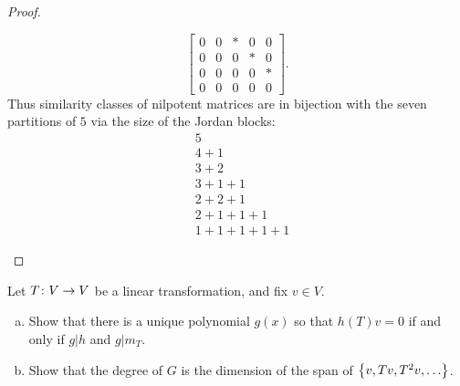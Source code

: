 \documentclass{article}
\begin{document}
\begin{proof}
\begin{enumerate}[(a)]
\[\begin{bmatrix}
        0 & 0 & * & 0 & 0 \\
        0 & 0 & 0 & * & 0 \\
        0 & 0 & 0 & 0 & * \\
        0 & 0 & 0 & 0 & 0
      \end{bmatrix}.
    \] Thus similarity classes of nilpotent matrices are in bijection with the
    seven partitions of $5$ via the size of the Jordan blocks: \begin{align*}
        &5 \\
        &4 + 1 \\
        &3 + 2 \\
        &3 + 1 + 1 \\
        &2 + 2 + 1 \\
        &2 + 1 + 1 + 1\\
        &1 + 1 + 1 + 1 + 1
    \end{align*}
  \end{enumerate}
\end{proof}

\begin{problem}{4} %
  Let $T \colon V \rightarrow V$ be a linear transformation, and fix $v \in V$.
  \begin{enumerate}[(a)]
    \item Show that there is a unique polynomial $g(x)$ so that $h(T)v = 0$ if
    and only if $g | h$ and $g | m_T$.
    \item Show that the degree of $G$ is the dimension of the span of
    $\left\{ v, Tv, T^2v, \hdots \right\}$.
  \end{enumerate}
\end{problem}
\end{document}
